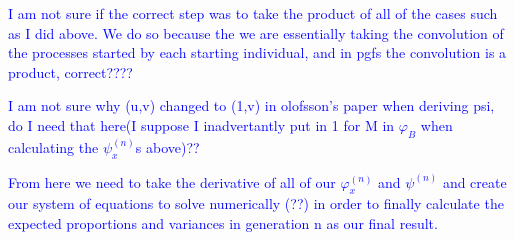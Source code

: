 \documentclass[12pt]{article}
\begin{document}
\textcolor{blue}{I am not sure if the correct step was to take the product of all of the cases such as I did above. We do so because the we are essentially taking the convolution of the processes started by each starting individual, and in pgfs the convolution is a product, correct????}

\textcolor{blue}{I am not sure why (u,v) changed to (1,v) in olofsson's paper when deriving psi, do I need that here(I suppose I inadvertantly put in 1 for M in $\varphi_B$ when calculating the $\psi_x^{(n)}$s above)??}

\textcolor{blue}{From here we need to take the derivative of all of our $\varphi_x^{(n)}$ and $\psi^{(n)}$ and create our system of equations to solve numerically (??) in order to finally calculate the expected proportions and variances in generation n as our final result.}
\clearpage
%
%
\end{document}
